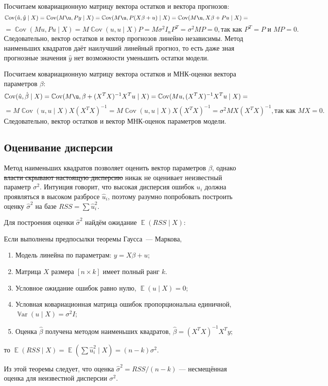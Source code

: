 \documentclass[12pt]{article}
\DeclareMathOperator{\Cov}{\mathbb{C}ov}
\DeclareMathOperator{\Var}{\mathbb{V}ar}
\DeclareMathOperator{\E}{\mathbb{E}}
\newcommand{\hb}{\hat{\beta}}
\newcommand{\hu}{\hat{u}}
\newcommand{\hy}{\hat{y}}
\newcommand{\RSS}{RSS}
\newcommand{\gaussmarkov}{
\begin{enumerate}[label=\arabic*.]
    \item Модель линейна по параметрам: $y = X\beta + u$;
    \item Матрица $X$ размера $[n \times k]$ имеет полный ранг $k$.
    \item Условное ожидание ошибок равно нулю, $\E(u\mid X) = 0$;
    \item Условная ковариационная матрица ошибок пропорциональна единичной, $\Var(u\mid X) = \sigma^2 I$;
    \item Оценка $\hb$ получена методом наименьших квадратов, $\hb = (X^T X)^{-1}X^T y$;
\end{enumerate}}
\begin{document}
Посчитаем ковариационную матрицу вектора остатков и вектора прогнозов:
\[
\Cov(\hu, \hy \mid X) = \Cov(M\u, Py \mid X) = \Cov(M\u, P(X\beta + u) \mid X) = \Cov(M\u, X\beta + Pu \mid X) =
\]
\[
=\Cov(Mu, Pu \mid X) = M \Cov(u,u \mid X) P = M \sigma^2I_n P^{T} = \sigma^2MP = 0, \text{так как } P^{T} = P \text{ и } MP = 0.
\]
Следовательно, вектор остатков и вектор прогнозов линейно независимы. Метод наименьших квадратов даёт наилучший линейный прогноз, то есть даже зная прогнозные значения $\hy$ нет возможности уменьшить остатки модели.

Посчитаем ковариационную матрицу вектора остатков и МНК-оценки вектора параметров $\beta$:
\[
\Cov(\hu, \hb \mid X) = \Cov(M\u, \beta + (X^{T}X)^{-1}X^{T}u \mid X) = \Cov(Mu,(X^{T}X)^{-1}X^{T}u \mid X) = 
\]
\[
=M\Cov(u, u \mid X) X(X^{T}X)^{-1} = M\Cov(u,u \mid X) X(X^{T}X)^{-1} = \sigma^2 MX(X^{T}X)^{-1}, \text{так как } MX = 0.
\]
Следовательно, вектор остатков и вектор МНК-оценок параметров модели.

\subsection{Оценивание дисперсии}

Метод наименьших квадратов позволяет оценить вектор параметров $\beta$, однако \sout{власти скрывают настоящую дисперсию} никак не оценивает неизвестный параметр $\sigma^2$.
Интуиция говорит, что высокая дисперсия ошибок $u_i$ должна проявляться в высоком разбросе $\hat u_i$, поэтому разумно попробовать построить оценку $\hat\sigma^2$ на базе $\RSS = \sum \hat u_i^2$.

Для построения оценки $\hat\sigma^2$ найдём ожидание $\E(\RSS \mid X)$:
\begin{theorem}
Если выполнены предпосылки теоремы Гаусса~— Маркова, 
\gaussmarkov
то $\E(\RSS \mid X) = \E(\sum \hu_i^2 \mid X) = (n - k) \sigma^2$.
\end{theorem}
Из этой теоремы следует, что оценка $\hat \sigma^2 = \RSS/ (n - k)$ — несмещённая оценка для неизвестной дисперсии $\sigma^2$.
\end{document}
